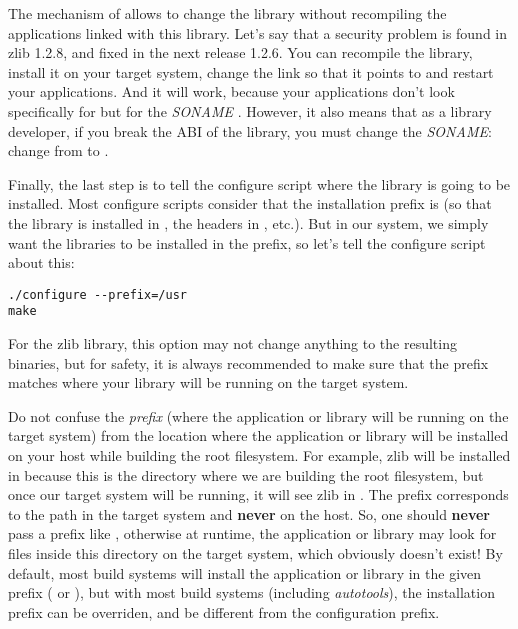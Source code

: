 The mechanism of  allows to change the library without
recompiling the applications linked with this library. Let's say that
a security problem is found in zlib 1.2.8, and fixed in the next
release 1.2.6. You can recompile the library, install it on your
target system, change the link  so that it points to
 and restart your applications. And it will work,
because your applications don't look specifically for
 but for the {\em SONAME}
. However, it also means that as a library developer,
if you break the ABI of the library, you must change the {\em SONAME}:
change from  to .

Finally, the last step is to tell the configure script where the
library is going to be installed. Most configure scripts consider that
the installation prefix is  (so that the library is
installed in , the headers in
, etc.). But in our system, we simply want
the libraries to be installed in the  prefix, so let's tell
the configure script about this:

\begin{verbatim}
./configure --prefix=/usr
make
\end{verbatim}

For the zlib library, this option may not change anything to the
resulting binaries, but for safety, it is always recommended to make
sure that the prefix matches where your library will be running on the
target system.

Do not confuse the {\em prefix} (where the application or library will
be running on the target system) from the location where the
application or library will be installed on your host while building
the root filesystem. For example, zlib will be installed in
 because
this is the directory where we are building the root filesystem, but
once our target system will be running, it will see zlib in
. The prefix corresponds to the path in the target
system and {\bf never} on the host. So, one should {\bf never} pass a
prefix like ,
otherwise at runtime, the application or library may look for files
inside this directory on the target system, which obviously doesn't
exist! By default, most build systems will install the application or
library in the given prefix ( or ), but
with most build systems (including {\em autotools}), the installation
prefix can be overriden, and be different from the configuration
prefix.

